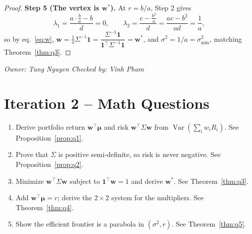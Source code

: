 \documentclass[11pt]{article}
\theoremstyle{plain}
\theoremstyle{definition}
\newcommand{\Var}{\operatorname{Var}}
\newcommand{\one}{\mathbf{1}}
\newcommand{\w}{\bm{w}}
\newcommand{\bmu}{\bm{\mu}}
\newcommand{\owner}[2]{\par\smallskip\noindent\textit{Owner: #1 \quad Checked by: #2}\par}
\begin{document}
\begin{proof}
\textbf{Step 5 (The vertex is $\w^*$).} At $r=b/a$, Step 2 gives
\[
\lambda_1 = \frac{a\cdot\frac{b}{a}-b}{d}=0,\qquad
\lambda_2 = \frac{c-\frac{b^2}{a}}{d}=\frac{ac-b^2}{ad}=\frac1a,
\]
so by eq.~\eqref{eq:w}, $\w=\frac{1}{a}\Sigma^{-1}\one = \dfrac{\Sigma^{-1}\one}{\one^\top\Sigma^{-1}\one}=\w^*$, and $\sigma^2=1/a=\sigma^2_{\min}$, matching Theorem~\ref{thm:q3}.
\end{proof}
\owner{Tung Nguyen}{Vinh Pham}

\section{Iteration 2 -- Math Questions}
\begin{enumerate}[label=\textbf{Q\arabic*.}]
  \item Derive portfolio return $\w^\top\bmu$ and risk $\w^\top\Sigma\w$ from $\Var(\sum_i w_iR_i)$. \hfill See Proposition~\ref{prop:q1}.
  \item Prove that $\Sigma$ is positive semi-definite, so risk is never negative. \hfill See Proposition~\ref{prop:q2}.
  \item Minimize $\w^\top\Sigma\w$ subject to $\one^\top\w=1$ and derive $\w^*$. \hfill See Theorem~\ref{thm:q3}.
  \item Add $\w^\top\bmu=r$; derive the $2\times2$ system for the multipliers. \hfill See Theorem~\ref{thm:q4}.
  \item Show the efficient frontier is a parabola in $(\sigma^2,r)$. \hfill See Theorem~\ref{thm:q5}.
\end{enumerate}

\end{document}
